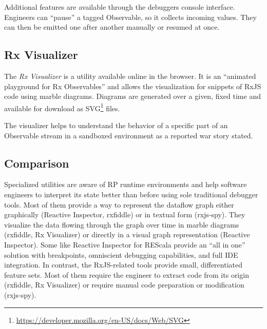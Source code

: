 \documentclass[12pt,a4paper]{article}
\begin{document}
Additional features are available through the debuggers console interface. Engineers can ``pause'' a tagged Observable, so it collects incoming values. They can then be emitted one after another manually or resumed at once.

\subsection{Rx Visualizer}

The \emph{Rx Visualizer}\cite{rxviz} is a utility available online in the browser. It is an ``animated playground for Rx Observables''\cite{rxviz} and allows the visualization for snippets of RxJS code using marble diagrams. Diagrams are generated over a given, fixed time and available for download as SVG\footnote{\url{https://developer.mozilla.org/en-US/docs/Web/SVG}} files.

The visualizer helps to understand the behavior of a specific part of an Observable stream in a sandboxed environment as a reported war story stated.

\subsection{Comparison}

Specialized utilities are aware of RP runtime environments and help software engineers to interpret its state better than before using sole traditional debugger tools. Most of them provide a way to represent the dataflow graph either graphically (Reactive Inspector, rxfiddle) or in textual form (rxjs-spy). They visualize the data flowing through the graph over time in marble diagrams (rxfiddle, Rx Visualizer) or directly in a visual graph representation (Reactive Inspector). Some like Reactive Inspector for REScala provide an ``all in one'' solution with breakpoints, omniscient debugging capabilities, and full IDE integration. In contrast, the RxJS-related tools provide small, differentiated feature sets. Most of them require the engineer to extract code from its origin (rxfiddle, Rx Visualizer) or require manual code preparation or modification (rxjs-spy).
\end{document}

